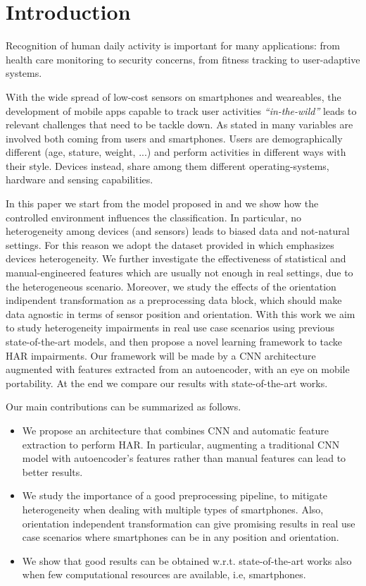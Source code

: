 
\section{Introduction}
\label{sec:introduction}

Recognition of human daily activity is important for many
applications: from health care monitoring to security concerns, from
fitness tracking to user-adaptive systems.

With the wide spread of low-cost sensors on smartphones and
weareables, the development of mobile apps capable to track user
activities \textit{``in-the-wild''} leads to relevant challenges that
need to be tackle down. As stated in \cite{blunck2013heterogeneity}
many variables are involved both coming from users and
smartphones. Users are demographically different (age, stature,
weight, ...) and perform activities in different ways with their
style. Devices instead, share among them different operating-systems,
hardware and sensing capabilities.

In this paper we start from the model proposed in
\cite{ignatov2018real} and we show how the controlled environment
influences the classification.  In particular, no heterogeneity among
devices (and sensors) leads to biased data and not-natural settings.
For this reason we adopt the dataset provided in
\cite{stisen2015smart} which emphasizes devices heterogeneity.  We
further investigate the effectiveness of statistical and
manual-engineered features which are usually not enough in real
settings, due to the heterogeneous scenario. Moreover, we study the
effects of the orientation indipendent transformation as a
preprocessing data block, which should make data agnostic in terms of
sensor position and orientation.  With this work we aim to study
heterogeneity impairments in real use case scenarios using previous
state-of-the-art models, and then propose a novel learning framework
to tacke HAR impairments. Our framework will be made by a CNN
architecture augmented with features extracted from an autoencoder,
with an eye on mobile portability.  At the end we compare our results
with state-of-the-art works.

Our main contributions can be summarized as follows.

\begin{itemize}
  \item We propose an architecture that combines CNN and automatic
    feature extraction to perform HAR. In particular, augmenting a
    traditional CNN model with autoencoder's features rather than
    manual features can lead to better results.
  \item We study the importance of a good preprocessing pipeline, to
    mitigate heterogeneity when dealing with multiple types of
    smartphones. Also, orientation independent transformation can give
    promising results in real use case scenarios where smartphones can
    be in any position and orientation.
  \item We show that good results can be obtained
    w.r.t. state-of-the-art works also when few computational
    resources are available, i.e, smartphones.
\end{itemize}

